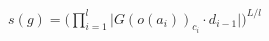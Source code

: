 \documentclass[preview]{standalone}
\begin{document}
\begin{align*}
s(g) = \big(\prod_{i=1}^{l}\big |G(o(a_i)) _{c_i} \cdot d_{i-1} \big|\big)^{L/l}
\end{align*}
\end{document}
